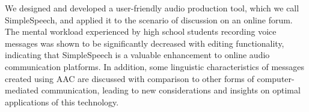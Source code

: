 We designed and developed a user-friendly audio production tool, which we call SimpleSpeech, and applied it to the scenario of discussion on an online forum. 
The mental workload experienced by high school students recording voice messages was shown to be significantly decreased with editing functionality, indicating that SimpleSpeech is a valuable enhancement to online audio communication platforms.
In addition, some linguistic characteristics of messages created using AAC are discussed with comparison to other forms of computer-mediated communication, leading to new considerations and insights on optimal applications of this technology.